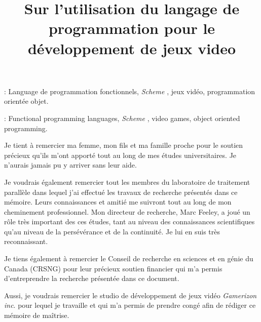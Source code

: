 \documentclass[12pt,twoside,letterpaper,francais]{book}
\title{Sur l'utilisation du langage de programmation \Schemelang pour
  le développement de jeux video}
\newcommand{\Schemelang}{{\textit{Scheme }}}
\begin{document}
\setcounter{page}{0}
\PagesCouverture

\setlength\textheight{9.0in}
\setlength\headsep{20pt}
\setlength\headheight{0in}
\setlength\topmargin{0in}
\addtolength{\voffset}{-0.5in}

\resume


\vspace{2em}

: Language de programmation fonctionnels,
\Schemelang, jeux vidéo, programmation orientée objet.

\abstract



\vspace{2em}

: Functional programming languages, \Schemelang,
video games, object oriented programming.



 
\tabledesmatieres

\listedestableaux

\listedesfigures


\remerciements

Je tient à remercier ma femme, mon fils et ma famille proche pour le
soutien précieux qu'ils m'ont apporté tout au long de mes études
universitaires. Je n'aurais jamais pu y arriver sans leur aide.

Je voudrais également remercier tout les membres du laboratoire de
traitement parallèle dans lequel j'ai effectué les travaux de
recherche présentés dans ce mémoire. Leurs connaissances et amitié me
suivront tout au long de mon cheminement professionnel. Mon directeur
de recherche, Marc Feeley, a joué un rôle très important des ces
études, tant au niveau des connaissances scientifiques qu'au niveau de
la persévérance et de la continuité. Je lui en suis très
reconnaissant. 

Je tiens également à remercier le Conseil de recherche en sciences et
en génie du Canada (CRSNG) pour leur précieux soutien financier qui
m'a permis d'entreprendre la recherche présentée dans ce document.

Aussi, je voudrais remercier le studio de développement de jeux vidéo
\textit{Gamerizon inc}. pour lequel je travaille et qui m'a permis de
prendre congé afin de rédiger ce mémoire de maîtrise.
\end{document}
